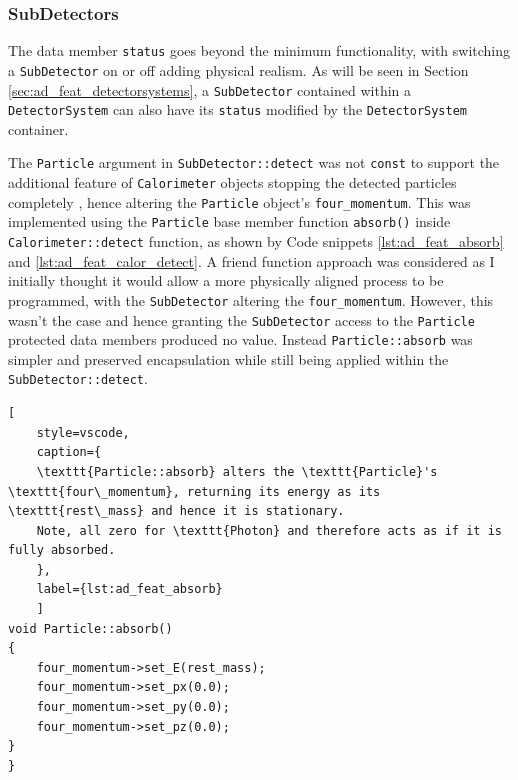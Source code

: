 \documentclass{article}
\begin{document}
\subsubsection{SubDetectors}
\label{sec:ad_feat_subdetectors}

The data member \texttt{status} goes beyond the minimum functionality, with switching a \texttt{SubDetector} on or off adding physical realism.
As will be seen in Section \ref{sec:ad_feat_detectorsystems}, a \texttt{SubDetector} contained within a \texttt{DetectorSystem} can also have its \texttt{status} modified by the \texttt{DetectorSystem} container.

The \texttt{Particle} argument in  \texttt{SubDetector::detect} was not \texttt{const} to support the additional feature of \texttt{Calorimeter} objects stopping the detected particles completely \cite{cms_detector}, hence altering the \texttt{Particle} object's \texttt{four\_momentum}.
This was implemented using the \texttt{Particle} base member function \texttt{absorb()} inside \texttt{Calorimeter::detect} function, as shown by Code snippets \ref{lst:ad_feat_absorb} and \ref{lst:ad_feat_calor_detect}.
A friend function approach was considered as I initially thought it would allow a more physically aligned process to be programmed, with the \texttt{SubDetector} altering the \texttt{four\_momentum}.
However, this wasn't the case and hence granting the \texttt{SubDetector} access to the \texttt{Particle} protected data members produced no value.
Instead \texttt{Particle::absorb} was simpler and preserved encapsulation while still being applied within the \texttt{SubDetector::detect}.
\begin{lstlisting}[
    style=vscode, 
    caption={
    \texttt{Particle::absorb} alters the \texttt{Particle}'s \texttt{four\_momentum}, returning its energy as its \texttt{rest\_mass} and hence it is stationary.
    Note, all zero for \texttt{Photon} and therefore acts as if it is fully absorbed.
    },
    label={lst:ad_feat_absorb}
    ]
void Particle::absorb()
{
    four_momentum->set_E(rest_mass);
    four_momentum->set_px(0.0);
    four_momentum->set_py(0.0);
    four_momentum->set_pz(0.0);
}
}
\end{lstlisting}
\end{document}
